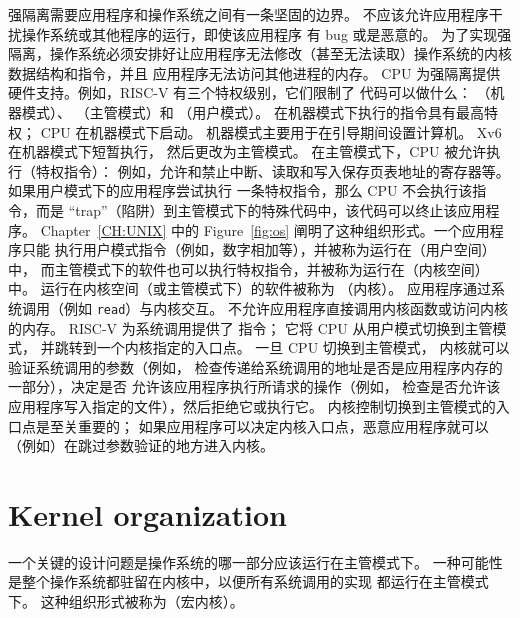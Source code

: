 强隔离需要应用程序和操作系统之间有一条坚固的边界。
不应该允许应用程序干扰操作系统或其他程序的运行，即使该应用程序
有 bug 或是恶意的。
为了实现强隔离，操作系统必须安排好让应用程序无法修改（甚至无法读取）操作系统的内核数据结构和指令，并且
应用程序无法访问其他进程的内存。
CPU 为强隔离提供硬件支持。例如，RISC-V 有三个特权级别，它们限制了
代码可以做什么：
（机器模式）、
（主管模式）和
（用户模式）。
在机器模式下执行的指令具有最高特权；
CPU 在机器模式下启动。
机器模式主要用于在引导期间设置计算机。
Xv6 在机器模式下短暂执行，
然后更改为主管模式。
在主管模式下，CPU 被允许执行（特权指令）：
例如，允许和禁止中断、读取和写入保存页表地址的寄存器等。
如果用户模式下的应用程序尝试执行
一条特权指令，那么 CPU 不会执行该指令，而是
“trap”（陷阱）到主管模式下的特殊代码中，该代码可以终止该应用程序。
Chapter~\ref{CH:UNIX} 中的 Figure~\ref{fig:os} 阐明了这种组织形式。一个应用程序只能
执行用户模式指令（例如，数字相加等），并被称为运行在（用户空间）中，
而主管模式下的软件也可以执行特权指令，并被称为运行在（内核空间）中。
运行在内核空间（或主管模式下）的软件被称为
（内核）。
应用程序通过系统调用（例如 {\tt read}）与内核交互。
不允许应用程序直接调用内核函数或访问内核的内存。
RISC-V 为系统调用提供了  指令；
它将 CPU 从用户模式切换到主管模式，
并跳转到一个内核指定的入口点。
一旦 CPU 切换到主管模式，
内核就可以验证系统调用的参数（例如，
检查传递给系统调用的地址是否是应用程序内存的一部分），决定是否
允许该应用程序执行所请求的操作（例如，
检查是否允许该应用程序写入指定的文件），然后拒绝它或执行它。
内核控制切换到主管模式的入口点是至关重要的；
如果应用程序可以决定内核入口点，恶意应用程序就可以（例如）在跳过参数验证的地方进入内核。
\section{Kernel organization}

一个关键的设计问题是操作系统的哪一部分应该运行在主管模式下。
一种可能性是整个操作系统都驻留在内核中，以便所有系统调用的实现
都运行在主管模式下。
这种组织形式被称为（宏内核）。

